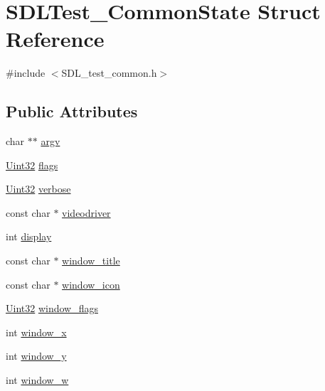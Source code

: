\hypertarget{struct_s_d_l_test___common_state}{}\section{S\+D\+L\+Test\+\_\+\+Common\+State Struct Reference}
\label{struct_s_d_l_test___common_state}


{\ttfamily \#include $<$S\+D\+L\+\_\+test\+\_\+common.\+h$>$}

\subsection*{Public Attributes}
\begin{DoxyCompactItemize}
\item 
char $\ast$$\ast$ \hyperlink{struct_s_d_l_test___common_state_a6db840410b86ab7c6807763fd8bcb081}{argv}
\item 
\hyperlink{_s_d_l__stdinc_8h_add440eff171ea5f55cb00c4a9ab8672d}{Uint32} \hyperlink{struct_s_d_l_test___common_state_a97272d03558f1f74e579ec8a5cdabc5e}{flags}
\item 
\hyperlink{_s_d_l__stdinc_8h_add440eff171ea5f55cb00c4a9ab8672d}{Uint32} \hyperlink{struct_s_d_l_test___common_state_aad4b8ebf6277cd9d3608d2e1b48e4678}{verbose}
\item 
const char $\ast$ \hyperlink{struct_s_d_l_test___common_state_ab3face917946465c60dc0f38f179534d}{videodriver}
\item 
int \hyperlink{struct_s_d_l_test___common_state_addb3de8e2b278deed8d2309bafd30758}{display}
\item 
const char $\ast$ \hyperlink{struct_s_d_l_test___common_state_a86640ebac0afe0c504c3c324d84dcc37}{window\+\_\+title}
\item 
const char $\ast$ \hyperlink{struct_s_d_l_test___common_state_ac9e981b2b60a59f995153c74242d9d43}{window\+\_\+icon}
\item 
\hyperlink{_s_d_l__stdinc_8h_add440eff171ea5f55cb00c4a9ab8672d}{Uint32} \hyperlink{struct_s_d_l_test___common_state_a9e38339b34b483087ff8d52d44a80809}{window\+\_\+flags}
\item 
int \hyperlink{struct_s_d_l_test___common_state_a5413ab562164642b3e6ee97ab5d938bf}{window\+\_\+x}
\item 
int \hyperlink{struct_s_d_l_test___common_state_a1fcd61cbe37c2bb563e7b2f1c6853d29}{window\+\_\+y}
\item 
int \hyperlink{struct_s_d_l_test___common_state_adc94ae1febd2aa3fa4b190cd0f8cb546}{window\+\_\+w}
$$
\end{DoxyCompactItemize}
